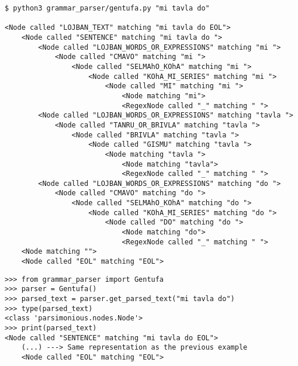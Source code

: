 \begin{lstlisting}[caption=Gentufa module being used as a command-line interface tool]
$ python3 grammar_parser/gentufa.py "mi tavla do"

<Node called "LOJBAN_TEXT" matching "mi tavla do EOL">
    <Node called "SENTENCE" matching "mi tavla do ">
        <Node called "LOJBAN_WORDS_OR_EXPRESSIONS" matching "mi ">
            <Node called "CMAVO" matching "mi ">
                <Node called "SELMAhO_KOhA" matching "mi ">
                    <Node called "KOhA_MI_SERIES" matching "mi ">
                        <Node called "MI" matching "mi ">
                            <Node matching "mi">
                            <RegexNode called "_" matching " ">
        <Node called "LOJBAN_WORDS_OR_EXPRESSIONS" matching "tavla ">
            <Node called "TANRU_OR_BRIVLA" matching "tavla ">
                <Node called "BRIVLA" matching "tavla ">
                    <Node called "GISMU" matching "tavla ">
                        <Node matching "tavla ">
                            <Node matching "tavla">
                            <RegexNode called "_" matching " ">
        <Node called "LOJBAN_WORDS_OR_EXPRESSIONS" matching "do ">
            <Node called "CMAVO" matching "do ">
                <Node called "SELMAhO_KOhA" matching "do ">
                    <Node called "KOhA_MI_SERIES" matching "do ">
                        <Node called "DO" matching "do ">
                            <Node matching "do">
                            <RegexNode called "_" matching " ">
    <Node matching "">
    <Node called "EOL" matching "EOL">
\end{lstlisting}

\begin{lstlisting}[caption=Gentufa class being used by a Python script]
>>> from grammar_parser import Gentufa
>>> parser = Gentufa()
>>> parsed_text = parser.get_parsed_text("mi tavla do")
>>> type(parsed_text)
<class 'parsimonious.nodes.Node'>
>>> print(parsed_text)
<Node called "SENTENCE" matching "mi tavla do EOL">
    (...) ---> Same representation as the previous example
    <Node called "EOL" matching "EOL">
\end{lstlisting}